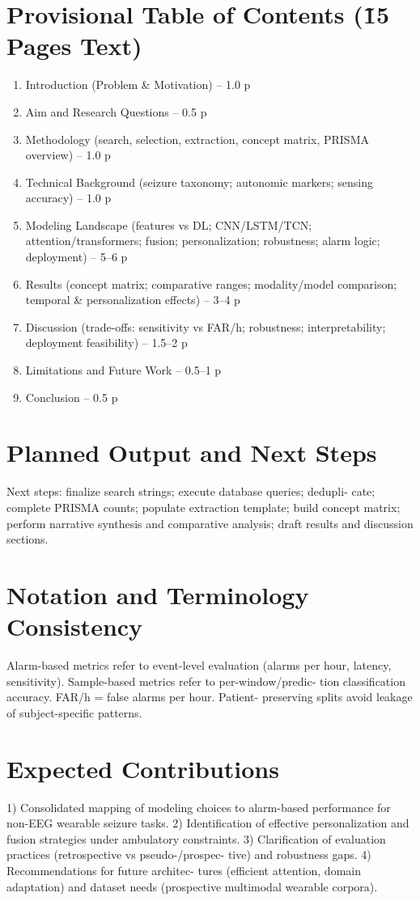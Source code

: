\section*{Provisional Table of Contents (\~15 Pages Text)}
\begin{enumerate}
  \item Introduction (Problem \& Motivation) -- 1.0 p
  \item Aim and Research Questions -- 0.5 p
  \item Methodology (search, selection, extraction, concept matrix,
    PRISMA overview) -- 1.0 p
  \item Technical Background (seizure taxonomy; autonomic markers;
    sensing accuracy) -- 1.0 p
  \item Modeling Landscape (features vs DL; CNN/LSTM/TCN;
    attention/transformers; fusion; personalization; robustness; alarm
    logic; deployment) -- 5--6 p
  \item Results (concept matrix; comparative ranges; modality/model
    comparison; temporal \& personalization effects) -- 3--4 p
  \item Discussion (trade-offs: sensitivity vs FAR/h; robustness;
    interpretability; deployment feasibility) -- 1.5--2 p
  \item Limitations and Future Work -- 0.5--1 p
  \item Conclusion -- 0.5 p
\end{enumerate}

\section*{Planned Output and Next Steps}
Next steps: finalize search strings; execute database queries; dedupli-
cate; complete PRISMA counts; populate extraction template; build
concept matrix; perform narrative synthesis and comparative analysis;
draft results and discussion sections.

\section*{Notation and Terminology Consistency}
Alarm-based metrics refer to event-level evaluation (alarms per hour,
latency, sensitivity). Sample-based metrics refer to per-window/predic-
tion classification accuracy. FAR/h = false alarms per hour. Patient-
preserving splits avoid leakage of subject-specific patterns.

\section*{Expected Contributions}
1) Consolidated mapping of modeling choices to alarm-based performance
for non-EEG wearable seizure tasks. 2) Identification of effective
personalization and fusion strategies under ambulatory constraints. 3)
Clarification of evaluation practices (retrospective vs pseudo-/prospec-
tive) and robustness gaps. 4) Recommendations for future architec-
tures (efficient attention, domain adaptation) and dataset needs
(prospective multimodal wearable corpora).

